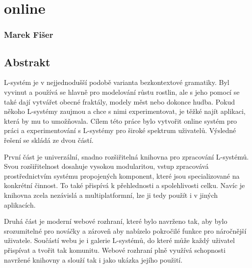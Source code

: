 
\chapter*{\lsystems online}

\subsection*{Marek Fišer}

\section*{Abstrakt}

\mbox{L-systém} je v nejjednodušší podobě varianta bezkontextové gramatiky.
Byl vyvi\-nut a používá se hlavně pro modelování růstu rostlin, ale s jeho pomocí se také dají vytvářet obecné fraktály, modely měst nebo dokonce hudba.
Pokud někoho \mbox{L-systémy} zaujmou a chce s nimi experimentovat, je těžké najít aplikaci, která by mu to umožňovala.
Cílem této práce bylo vytvořit online systém pro práci a experimentování s L-systémy pro široké spektrum uživatelů.
Výsledné řešení se skládá ze dvou částí.

První část je univerzální, snadno rozšiřitelná knihovna pro zpracování \mbox{L-sys}\-témů.
Svou rozšiřitelnost dosahuje vysokou modularitou, vstup zpracovává pros\-třednic\-tvím systému propojených komponent, které jsou specializované na kon\-krét\-ní činnost.
To také přispívá k přehlednosti a spolehlivosti celku.
Navíc je knihovna zcela nezávislá a multiplatformní, lze ji tedy použít i v jiných aplikacích.

Druhá část je moderní webové rozhraní, které bylo navrženo tak, aby bylo srozumitelné pro nováčky a zároveň aby nabízelo pokročilé funkce pro nároč\-nější uživatele.
Součástí webu je i galerie L-systémů, do které může každý uživatel přispívat a tvořit tak komunitu.
Webové rozhraní plně využívá schopnosti navr\-žené knihovny a slouží tak i jako ukázka jejího použití.





























